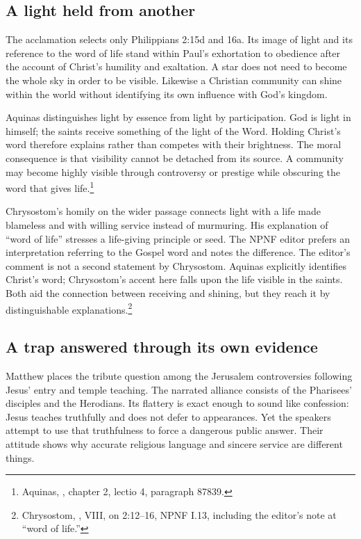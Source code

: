 \subsection{A light held from another}
The acclamation selects only Philippians 2:15d and 16a. Its image of light and its reference to the word of life stand within Paul's exhortation to obedience after the account of Christ's humility and exaltation. A star does not need to become the whole sky in order to be visible. Likewise a Christian community can shine within the world without identifying its own influence with God's kingdom.

Aquinas distinguishes light by essence from light by participation. God is light in himself; the saints receive something of the light of the Word. Holding Christ's word therefore explains rather than competes with their brightness. The moral consequence is that visibility cannot be detached from its source. A community may become highly visible through controversy or prestige while obscuring the word that gives life.\footnote{Aquinas, , chapter 2, lectio 4, paragraph 87839.}

Chrysostom's homily on the wider passage connects light with a life made blameless and with willing service instead of murmuring. His explanation of ``word of life'' stresses a life-giving principle or seed. The NPNF editor prefers an interpretation referring to the Gospel word and notes the difference. The editor's comment is not a second statement by Chrysostom. Aquinas explicitly identifies Christ's word; Chrysostom's accent here falls upon the life visible in the saints. Both aid the connection between receiving and shining, but they reach it by distinguishable explanations.\footnote{Chrysostom, , VIII, on 2:12--16, NPNF I.13, including the editor's note at ``word of life.''}

\subsection{A trap answered through its own evidence}
Matthew places the tribute question among the Jerusalem controversies following Jesus' entry and temple teaching. The narrated alliance consists of the Pharisees' disciples and the Herodians. Its flattery is exact enough to sound like confession: Jesus teaches truthfully and does not defer to appearances. Yet the speakers attempt to use that truthfulness to force a dangerous public answer. Their attitude shows why accurate religious language and sincere service are different things.

